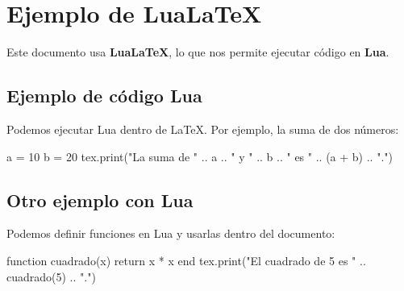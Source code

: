 \documentclass{article}
\begin{document}
\section{Ejemplo de LuaLaTeX}

Este documento usa \textbf{LuaLaTeX}, lo que nos permite ejecutar código en \textbf{Lua}.

\subsection{Ejemplo de código Lua}
Podemos ejecutar Lua dentro de LaTeX. Por ejemplo, la suma de dos números:

\begin{luacode}
a = 10
b = 20
tex.print("La suma de " .. a .. " y " .. b .. " es " .. (a + b) .. ".")
\end{luacode}

\subsection{Otro ejemplo con Lua}
Podemos definir funciones en Lua y usarlas dentro del documento:

\begin{luacode*}
function cuadrado(x)
  return x * x
end
tex.print("El cuadrado de 5 es " .. cuadrado(5) .. ".")
\end{luacode*}
\end{document}
